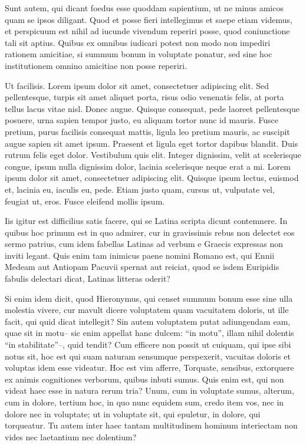 \documentclass[twoside]{extreport}
\begin{document}
\begin{description}
\begin{description}
\begin{description}
\begin{description}
\tightlist
\item[Item B1b1]
Sunt autem, qui dicant foedus esse quoddam sapientium, ut ne minus
amicos quam se ipsos diligant. Quod et posse fieri intellegimus et saepe
etiam videmus, et perspicuum est nihil ad iucunde vivendum reperiri
posse, quod coniunctione tali sit aptius. Quibus ex omnibus iudicari
potest non modo non impediri rationem amicitiae, si summum bonum in
voluptate ponatur, sed sine hoc institutionem omnino amicitiae non posse
reperiri.
\end{description}
\end{description}
\item[Item B2]
Ut facilisis. Lorem ipsum dolor sit amet, consectetuer adipiscing elit.
Sed pellentesque, turpis sit amet aliquet porta, risus odio venenatis
felis, at porta tellus lacus vitae nisl. Donec augue. Quisque consequat,
pede laoreet pellentesque posuere, urna sapien tempor justo, eu aliquam
tortor nunc id mauris. Fusce pretium, purus facilisis consequat mattis,
ligula leo pretium mauris, ac suscipit augue sapien sit amet ipsum.
Praesent et ligula eget tortor dapibus blandit. Duis rutrum felis eget
dolor. Vestibulum quis elit. Integer dignissim, velit at scelerisque
congue, ipsum nulla dignissim dolor, lacinia scelerisque neque erat a
mi. Lorem ipsum dolor sit amet, consectetuer adipiscing elit. Quisque
ipsum lectus, euismod et, lacinia eu, iaculis eu, pede. Etiam justo
quam, cursus ut, vulputate vel, feugiat ut, eros. Fusce eleifend mollis
ipsum.
\end{description}
\item[Item C]
Iis igitur est difficilius satis facere, qui se Latina scripta dicunt
contemnere. In quibus hoc primum est in quo admirer, cur in gravissimis
rebus non delectet eos sermo patrius, cum idem fabellas Latinas ad
verbum e Graecis expressas non inviti legant. Quis enim tam inimicus
paene nomini Romano est, qui Ennii Medeam aut Antiopam Pacuvii spernat
aut reiciat, quod se isdem Euripidis fabulis delectari dicat, Latinas
litteras oderit?
\item[Item D]
Si enim idem dicit, quod Hieronymus, qui censet summum bonum esse sine
ulla molestia vivere, cur mavult dicere voluptatem quam vacuitatem
doloris, ut ille facit, qui quid dicat intellegit? Sin autem voluptatem
putat adiungendam eam, quae sit in motu-- sic enim appellat hanc dulcem:
``in motu'', illam nihil dolentis ``in stabilitate''--, quid tendit? Cum
efficere non possit ut cuiquam, qui ipse sibi notus sit, hoc est qui
suam naturam sensumque perspexerit, vacuitas doloris et voluptas idem
esse videatur. Hoc est vim afferre, Torquate, sensibus, extorquere ex
animis cognitiones verborum, quibus inbuti sumus. Quis enim est, qui non
videat haec esse in natura rerum tria? Unum, cum in voluptate sumus,
alterum, cum in dolore, tertium hoc, in quo nunc equidem sum, credo item
vos, nec in dolore nec in voluptate; ut in voluptate sit, qui epuletur,
in dolore, qui torqueatur. Tu autem inter haec tantam multitudinem
hominum interiectam non vides nec laetantium nec dolentium?
\end{description}
\end{document}
